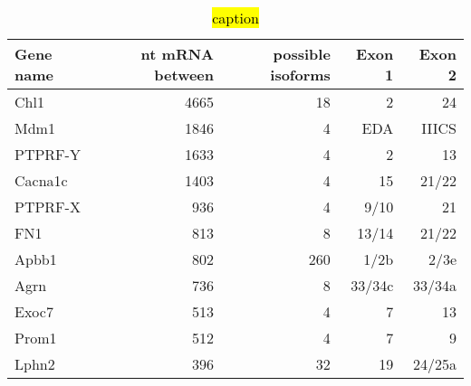 \begin{table}[h]\small
  \begin{tabular}{|l|r|r|r|r|}

  \hline
  \textbf{Gene name} & \textbf{nt mRNA between} & \textbf{possible isoforms} & \textbf{Exon 1} & \textbf{Exon 2} \\ \hline
  Chl1               & 4665                              & 18                         & 2               & 24              \\ \hline
  Mdm1               & 1846                              & 4                          & EDA             & IIICS           \\ \hline
  PTPRF-Y            & 1633                              & 4                          & 2               & 13              \\ \hline
  Cacna1c            & 1403                              & 4                          & 15              & 21/22           \\ \hline
  PTPRF-X            & 936                               & 4                          & 9/10            & 21              \\ \hline
  FN1                & 813                               & 8                          & 13/14           & 21/22           \\ \hline
  Apbb1              & 802                               & 260                        & 1/2b            & 2/3e            \\ \hline
  Agrn               & 736                               & 8                          & 33/34c          & 33/34a          \\ \hline
  Exoc7              & 513                               & 4                          & 7               & 13              \\ \hline
  Prom1              & 512                               & 4                          & 7               & 9               \\ \hline
  Lphn2              & 396                               & 32                         & 19              & 24/25a          \\ \hline
  \end{tabular}
    \caption[Genes with big spans in between]{\hl{caption}}
    \label{table: BigSpanGenes}
  \end{table}
